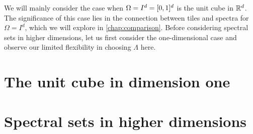 \documentclass[../thesis.tex]{subfiles}
\begin{document}
We will mainly consider the case when $\Omega=I^d=[0,1]^d$ is the unit cube in $\mathbb{R}^d$. The significance of this case lies in the connection between tiles and spectra for $\Omega=I^d$, which we will explore in \cref{chap:comparison}. Before considering spectral sets in higher dimensions, let us first consider the one-dimensional case and observe our limited flexibility in choosing $\Lambda$ here.

\section{The unit cube in dimension one}\label{sec:complx_trig_1d}
    





\section{Spectral sets in higher dimensions}\label{sec:spec_higher_dim}
    
\end{document}
